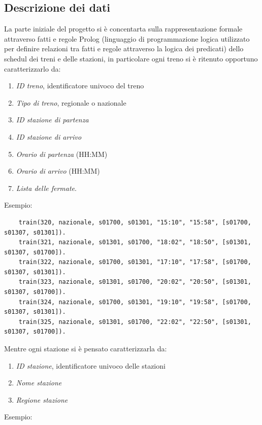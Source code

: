 \documentclass[italian,12pt,a4paper]{article}
\begin{document}
	\subsection{Descrizione dei dati}
	La parte iniziale del progetto si è concentarta sulla rappresentazione formale attraverso fatti e regole Prolog (linguaggio di programmazione logica utilizzato per definire relazioni tra fatti e regole attraverso la logica dei predicati) dello schedul dei treni e delle stazioni, in particolare ogni treno si è ritenuto opportuno caratterizzarlo da:
	
		\begin{enumerate}
			\item \textit{ID treno}, identificatore univoco del treno
			\item \textit{Tipo di treno}, regionale o nazionale
			\item \textit{ID stazione di partenza}
			\item \textit{ID stazione di arrivo}
			\item\textit{Orario di partenza} (HH:MM)
			\item \textit{Orario di arrivo} (HH:MM)
			\item \textit{Lista delle fermate}.
		\end{enumerate}
		Esempio:
		
\begin{small}

\begin{verbatim}
	train(320, nazionale, s01700, s01301, "15:10", "15:58", [s01700, s01307, s01301]).
	train(321, nazionale, s01301, s01700, "18:02", "18:50", [s01301, s01307, s01700]).
	train(322, nazionale, s01700, s01301, "17:10", "17:58", [s01700, s01307, s01301]).
	train(323, nazionale, s01301, s01700, "20:02", "20:50", [s01301, s01307, s01700]).
	train(324, nazionale, s01700, s01301, "19:10", "19:58", [s01700, s01307, s01301]).
	train(325, nazionale, s01301, s01700, "22:02", "22:50", [s01301, s01307, s01700]).
\end{verbatim}
\end{small}
	Mentre ogni stazione si è pensato caratterizzarla da:
	
			\begin{enumerate}
				\item \textit{ID stazione}, identificatore univoco delle stazioni
				\item \textit{Nome stazione}
				\item \textit{Regione stazione}
			\end{enumerate}
		Esempio:
\end{document}
